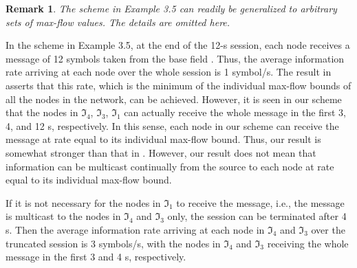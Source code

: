 \documentclass[journal]{IEEEtran}
\newtheorem*{rema}{Remark}
\begin{document}
\begin{rema}
	The scheme in Example 3.5 can readily be generalized to arbitrary sets of max-flow values. The details are omitted here.
\end{rema}


\par	
In the scheme in Example 3.5, at the end of the 12-s session, each node receives a message of 12 symbols taken from the base field . Thus, the average information rate arriving at each node over the whole session is 1 symbol/s. The result in \cite{RNSNetwork} asserts that this rate, which is the minimum of the individual max-flow bounds of all the nodes in the network, can be achieved. However, it is seen in our scheme that the nodes in $\Im_4$, $\Im_3$, $\Im_1$ can actually receive the whole message in the first 3, 4, and 12 s, respectively. In this sense, each node in our scheme can receive the message at rate equal to its individual max-flow bound. Thus, our result is somewhat stronger than that in \cite{RNSNetwork}. However, our result does not mean that information can be multicast continually from the source to each node at rate equal to its individual max-flow bound.
\par
If it is not necessary for the nodes in $\Im_1$ to receive the message, i.e., the message is multicast to the nodes in $\Im_4$ and $\Im_3$ only, the session can be terminated after 4 s. Then the average information rate arriving at each node in $\Im_4$ and $\Im_3$ over the truncated session is 3 symbols/s, with the nodes in $\Im_4$ and $\Im_3$ receiving the whole message in the first 3 and 4 s, respectively.
\end{document}
